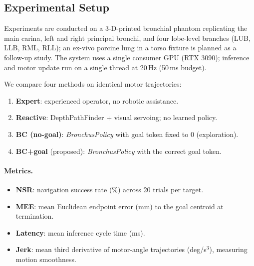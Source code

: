 \documentclass[journal,comsoc]{IEEEtran}
\begin{document}
\subsection{Experimental Setup}
Experiments are conducted on a 3-D-printed bronchial phantom
replicating the main carina, left and right principal bronchi, and
four lobe-level branches (LUB, LLB, RML, RLL); an ex-vivo porcine
lung in a torso fixture is planned as a follow-up study. The system
uses a single consumer GPU (RTX 3090); inference and motor update run
on a single thread at 20\,Hz (50\,ms budget).

We compare four methods on identical motor trajectories:
\begin{enumerate}[leftmargin=*,topsep=2pt,itemsep=0pt]
\item \textbf{Expert}: experienced operator, no robotic assistance.
\item \textbf{Reactive}: DepthPathFinder + visual servoing; no
      learned policy.
\item \textbf{BC (no-goal)}: \textit{BronchusPolicy} with goal token
      fixed to 0 (exploration).
\item \textbf{BC+goal} (proposed): \textit{BronchusPolicy} with the
      correct goal token.
\end{enumerate}

\paragraph{Metrics.}
\begin{itemize}[leftmargin=*,topsep=1pt,itemsep=0pt]
\item \textbf{NSR}: navigation success rate (\%) across 20 trials
      per target.
\item \textbf{MEE}: mean Euclidean endpoint error (mm) to the goal
      centroid at termination.
\item \textbf{Latency}: mean inference cycle time (ms).
\item \textbf{Jerk}: mean third derivative of motor-angle trajectories
      (deg/s$^3$), measuring motion smoothness.
\end{itemize}
\end{document}
